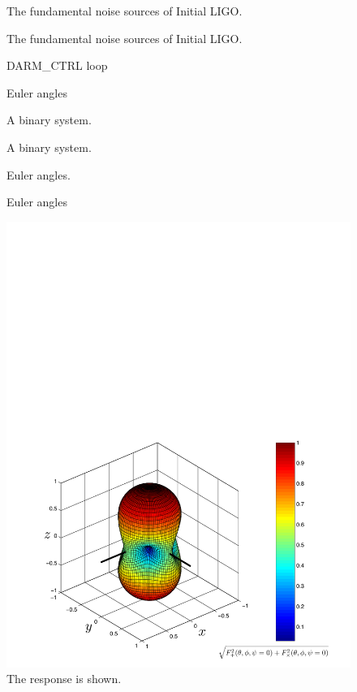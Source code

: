 \begin{figure}[p]
\begin{center}
The fundamental noise sources of Initial LIGO.
\end{center}
\caption{\label{f:design_noisecurve}%
The fundamental noise sources of Initial LIGO.
}
\end{figure}

\begin{figure}[p]
\begin{center}
DARM\_CTRL loop
\end{center}
\caption[Differential mode control servo loop]{\label{f:darmloop}%
Euler angles
}
\end{figure}

\begin{figure}[p]
\begin{center}
A binary system.
\end{center}
\caption{\label{f:binary}%
A binary system.
}
\end{figure}

\begin{figure}[p]
\begin{center}
Euler angles.
\end{center}
\caption{\label{f:euler}%
Euler angles
}
\end{figure}

\begin{figure}[p]
\begin{center}
\includegraphics[width=\linewidth]{figures/inspiral/beampattern}
\end{center}
\caption[Beam patter of an interferometric gravitational wave detector]{\label{f:beampattern}%
The response is shown.
}
\end{figure}



